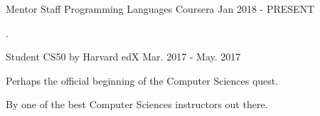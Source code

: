 

\begin{cventries}

  \cventry
    {Mentor Staff} %
    {Programming Languages} %
    {Coursera} %
    {Jan 2018 - PRESENT} %
    {
      \begin{cvitems} %
        \item {.}
      \end{cvitems}
    }

  \cventry
    {Student} %
    {CS50 by Harvard} %
    {edX} %
	{Mar. 2017 - May. 2017} %
    {
      \begin{cvitems} %
        \item {Perhaps the official beginning of the Computer Sciences quest.}
        \item {By one of the best Computer Sciences instructors out there.}
      \end{cvitems}
    }

\end{cventries}
